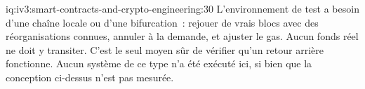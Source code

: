\begin{solution}{iq:iv3:smart-contracts-and-crypto-engineering:30}
L'environnement de test a besoin d'une chaîne locale ou d'une bifurcation~: rejouer de vrais blocs avec des réorganisations connues, annuler à la demande, et ajuster le gas. Aucun fonds réel ne doit y transiter. C'est le seul moyen sûr de vérifier qu'un retour arrière fonctionne. Aucun système de ce type n'a été exécuté ici, si bien que la conception ci-dessus n'est pas mesurée.

\end{solution}
